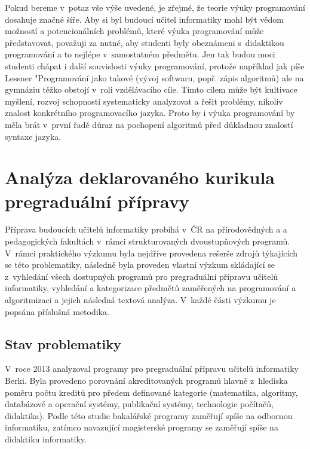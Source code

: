 \documentclass[FP,DP]{tulthesis}
\begin{document}
{{{{{{{Pokud bereme v~potaz vše výše uvedené, je zřejmé, že teorie výuky programování dosahuje značné šíře. Aby si byl budoucí učitel informatiky mohl být vědom možností a potencionálních problémů, které výuka programování může představovat, považuji za nutné, aby studenti byly obeznámeni s~didaktikou programování a to nejlépe v~samostatném předmětu.  Jen tak budou moci studenti chápat i další souvislosti výuky programování, protože například jak píše Lessner \citep[s. 13]{lessner2013} "Programování jako takové (vývoj softwaru, popř. zápis algoritmů) ale na gymnáziu těžko obstojí v~roli vzdělávacího cíle. Tímto cílem může být
kultivace myšlení, rozvoj schopnosti systematicky analyzovat a řešit problémy, nikoliv znalost konkrétního programovacího jazyka. Proto by i výuka programování by měla brát v~první řadě důraz na pochopení algoritmů před důkladnou znalostí syntaxe jazyka.
\chapter{Analýza deklarovaného kurikula pregraduální přípravy}
Příprava budoucích učitelů informatiky probíhá v~ČR na přírodovědných a a pedagogických fakultách v~rámci strukturovaných dvoustupňových programů. V~rámci praktického výzkumu byla nejdříve provedena rešerše zdrojů týkajících se této problematiky, následně byla proveden vlastní výzkum skládající se z~vyhledání všech dostupných programů pro pregraduální přípravu učitelů informatiky, vyhledání a kategorizace předmětů zaměřených na programování a algoritmizaci a jejich následná textová analýza. V~každé části výzkumu je popsána příslušná metodika.

\section{Stav problematiky}
V~roce 2013 analyzoval programy pro pregraduální přípravu učitelů informatiky Berki. Byla provedeno porovnání akreditovaných programů  hlavně z~hlediska poměru počtu kreditů pro předem definované kategorie (matematika, algoritmy, databázové a operační systémy, publikační systémy, technologie počítačů, didaktika). Podle této studie bakalářské programy zaměřují spíše na odbornou informatiku, zatímco navazující magisterské programy se zaměřují spíše na didaktiku informatiky. 

}}}}}}}
\end{document}
